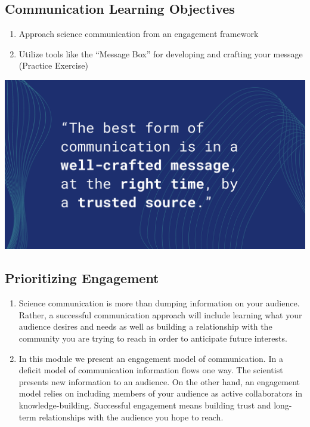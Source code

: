 \documentclass[
]{book}
\providecommand{\tightlist}{%
  \setlength{\itemsep}{0pt}\setlength{\parskip}{0pt}}
\begin{document}
\hypertarget{communication-learning-objectives}{%
\subsection{Communication Learning Objectives}\label{communication-learning-objectives}}

\begin{enumerate}
\def\labelenumi{\arabic{enumi}.}
\tightlist
\item
  Approach science communication from an engagement framework
\item
  Utilize tools like the ``Message Box'' for developing and crafting your message (Practice Exercise)
\end{enumerate}

\includegraphics{images/Mantra_for_Lilli.png}

\hypertarget{prioritizing-engagement}{%
\subsection{Prioritizing Engagement}\label{prioritizing-engagement}}

\begin{enumerate}
\def\labelenumi{\arabic{enumi}.}
\item
  Science communication is more than dumping information on your audience. Rather, a successful communication approach will include learning what your audience desires and needs as well as building a relationship with the community you are trying to reach in order to anticipate future interests.
\item
  In this module we present an engagement model of communication. In a deficit model of communication information flows one way. The scientist presents new information to an audience. On the other hand, an engagement model relies on including members of your audience as active collaborators in knowledge-building. Successful engagement means building trust and long-term relationships with the audience you hope to reach.
\end{enumerate}
\end{document}

